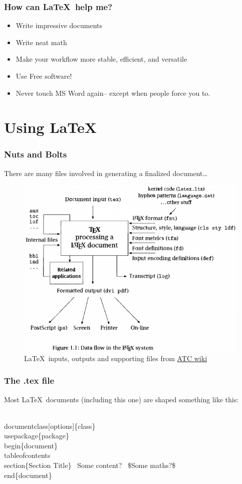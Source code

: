 \documentclass{beamer}
\begin{document}
\begin{frame}
\frametitle{How can \LaTeX\ help me?}
\begin{itemize}
\item{Write impressive documents}
\item{Write neat math}
\item{Make your workflow more stable, efficient, and versatile }
\item{Use Free software!}
\item{Never touch MS Word again-- except when people force you to.}
\end{itemize}
\end{frame}

\section{Using  \LaTeX }

\begin{frame}
\frametitle{Nuts and Bolts}
There are many files involved in generating a finalized document\dots
\begin{figure}
	\includegraphics[scale = 0.3]{latex_dataflow.png}
	\caption{\tiny{\LaTeX\ inputs, outputs and supporting files from \href{http://webhost1.ust.hk/~atcwiki/cgi-bin/atcwiki/index.php?title=ATC:LaTeX}{ATC wiki}}}
\end{figure}
\end{frame}

\begin{frame}[fragile]
	\frametitle{The .tex file}
	Most \LaTeX\ documents (including this one) are shaped something like this:
		\begin{semiverbatim}
			\\documentclass[options]\{class\}
			\\usepackage\{package\}
			\\begin\{document\}
			\\tableofcontents
			\\section\{Section Title\}
		\-\	Some content?
		\-\	\$Some maths?\$
			\\end\{document\}
		\end{semiverbatim}
\end{frame}
\end{document}
